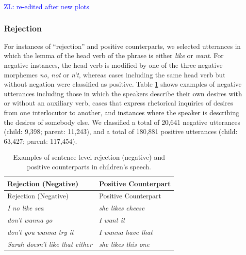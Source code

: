 \documentclass[
  english,
  man,floatsintext]{apa6}
\begin{document}
\textcolor{blue}{ZL: re-edited after new plots}

\hypertarget{rejection}{%
\subsubsection{Rejection}\label{rejection}}

For instances of ``rejection'' and positive counterparts, we selected utterances in which the lemma of the head verb of the phrase is either \emph{like} or \emph{want}. For negative instances, the head verb is modified by one of the three negative morphemes \emph{no}, \emph{not} or \emph{n't}, whereas cases including the same head verb but without negation were classified as positive. Table \ref{tab:rejection} shows examples of negative utterances including those in which the speakers describe their own desires with or without an auxiliary verb, cases that express rhetorical inquiries of desires from one interlocutor to another, and instances where the speaker is describing the desires of somebody else. We classified a total of 20,641 negative utterances (child: 9,398; parent: 11,243), and a total of 180,881 positive utterances (child: 63,427; parent: 117,454).

\begin{longtable}[]{@{}ll@{}}
\caption{\label{tab:rejection} Examples of sentence-level rejection (negative) and positive counterparts in children's speech.}\tabularnewline
\toprule
Rejection (Negative) & Positive Counterpart \\
\midrule
\endfirsthead
\toprule
Rejection (Negative) & Positive Counterpart \\
\midrule
\endhead
\emph{I no like sea} & \emph{she likes cheese} \\
\emph{don't wanna go} & \emph{I want it} \\
\emph{don't you wanna try it} & \emph{I wanna have that} \\
\emph{Sarah doesn't like that either} & \emph{she likes this one} \\
\bottomrule
\end{longtable}
\end{document}
